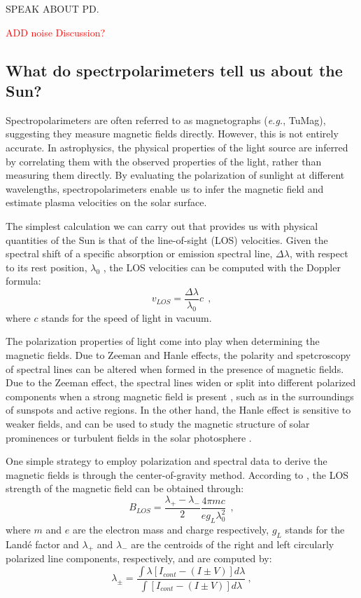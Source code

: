 SPEAK ABOUT PD. 

\textcolor{red}{ADD noise Discussion?}
 
\subsection{What do spectrpolarimeters tell us about the Sun?}

Spectropolarimeters are often referred to as magnetographs (\textit{e.g.}, TuMag), suggesting they measure magnetic fields directly. However, this is not entirely accurate. In astrophysics, the physical properties of the light source are inferred by correlating them with the observed properties of the light, rather than measuring them directly. By evaluating the polarization of sunlight at different wavelengths, spectropolarimeters enable us to infer the magnetic field and estimate plasma velocities on the solar surface. 

The simplest calculation we can carry out that provides us with physical quantities of the Sun is that of the line-of-sight (LOS) velocities. Given the spectral shift of a specific absorption or emission spectral line, $\Delta \lambda$, with respect to its rest position, $\lambda _ 0$ , the LOS velocities can be computed with the Doppler formula: 
\begin{equation}
  v_{LOS} = \frac{\Delta \lambda}{\lambda _ 0}c\ \ ,
  \label{eq_spectro: Doppler}
\end{equation}
where $c$ stands for the speed of light in vacuum. 

The polarization properties of light come into play when determining the magnetic fields. Due to Zeeman and Hanle effects, the polarity and spetcroscopy of spectral lines can be altered when formed in the presence of magnetic fields. Due to the Zeeman effect, the spectral lines widen or split into different polarized components when a strong magnetic field is present \citep{libro_JoseCarlos}, such as in the surroundings of sunspots and active regions. In the other hand, the Hanle effect is sensitive to weaker fields, and can be used to study the magnetic structure of solar prominences or turbulent fields in the solar photosphere \citep{hanle}. 

One simple strategy to employ polarization and spectral data to derive the magnetic fields is through the center-of-gravity method. According to \cite{center_of_gravity}, the LOS strength of the magnetic field can be obtained through:
\begin{equation}
  B_{LOS} = \frac{\lambda _ {+} - \lambda _ -}{2}\frac{4\pi m c}{eg_{L}\lambda_0 ^2}\ \ ,
  \label{eq_spectro: Blos-cog}
\end{equation}  
where $m$ and $e$ are the electron mass and charge respectively, $g_L$ stands for the Landé factor and $\lambda _ {+}$ and $\lambda _ {-}$ are the centroids of the right and left circularly polarized line components, respectively, and are computed by:
\begin{equation}
  \lambda _ {\pm} = \frac{\int \lambda \left[I_{cont} - (I \pm V)\right]d\lambda}{\int \left[I_{cont} - (I \pm V)\right]d\lambda} \ ,
  \label{eq_spectro: lambda_plus_minus}
\end{equation} 

